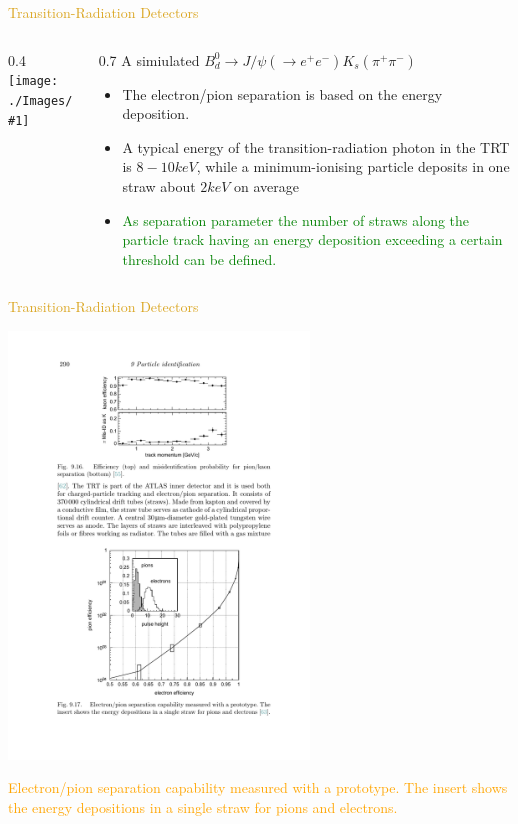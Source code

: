 \documentclass[11pt]{beamer} %
\renewcommand{\(}{\begin{columns}}
\renewcommand{\)}{\end{columns}}
\newcommand{\<}[1]{\begin{column}{#1}}
\renewcommand{\>}{\end{column}}
\newcommand{\itt}{\begin{itemize}}
\newcommand{\tti}{\end{itemize}}
\newcommand{\img}[1]{\texttt{[image: ./Images/\#1]}}
\newcommand{\hlt}[2]{\textcolor{#1}{\textbf{#2}}}
\newcommand{\beginbackup}
           {
             \newcounter{framenumbervorappendix}
             \setcounter{framenumbervorappendix}{\value{framenumber}}
           }
\newcommand{\backupend}
           {
             \addtocounter{framenumbervorappendix}{-\value{framenumber}}
             \addtocounter{framenumber}{\value{framenumbervorappendix}} 
           }
\begin{document}
\begin{frame}{\textcolor{Goldenrod}{Transition-Radiation Detectors}}
  \(
  \<{0.4\textwidth}
  \img{TRD_02}
  \>
  \<{0.7\textwidth}
  \small
  A simiulated $ B^0_d \to J/\psi (\to e^+e^-) K_s(\pi^+\pi^-)$
  \itt
\item The
  electron/pion separation is based on the energy deposition.
\item A typical
  energy of the transition-radiation photon in the TRT is $8 -10keV$, while
  a minimum-ionising particle deposits in one straw about $2keV$ on
  average
\item \textcolor{green}{As separation parameter the number of
  straws along the particle track having an energy deposition exceeding
  a certain threshold can be defined.}
  \tti
  \>
  \)
\end{frame}  


\begin{frame}{\textcolor{Goldenrod}{Transition-Radiation Detectors}}
  \begin{center}
    \includegraphics[width=0.6\textwidth, height=0.4\textheight]{./Images/TRD_03}
  \end{center}
  \textcolor{Orange}{Electron/pion separation capability measured with a prototype.
    The insert shows the energy depositions in a single straw for pions
    and electrons.}
\end{frame}  




\end{document}
